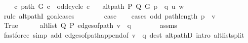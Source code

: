 \begin{isabellebody}
\ \ \ {\isachardoublequoteopen}{\isasymnot}\ {\isacharparenleft}{\kern0pt}{\isasymexists}c{\isachardot}{\kern0pt}\ path\ G\ c\ {\isasymand}\ odd{\isacharunderscore}{\kern0pt}cycle\ c{\isacharparenright}{\kern0pt}{\isachardoublequoteclose}\isanewline
\ \ \ {\isachardoublequoteopen}alt{\isacharunderscore}{\kern0pt}path\ P\ Q\ G\ {\isacharparenleft}{\kern0pt}p{\isacharprime}{\kern0pt}\ {\isacharat}{\kern0pt}\ q{\isacharparenright}{\kern0pt}\ u\ w{\isachardoublequoteclose}\isanewline
%
\isadelimproof
%
\endisadelimproof
%
\isatagproof
{}\isamarkupfalse%
\ {\isacharparenleft}{\kern0pt}rule\ alt{\isacharunderscore}{\kern0pt}pathI{\isacharcomma}{\kern0pt}\ goal{\isacharunderscore}{\kern0pt}cases{\isacharparenright}{\kern0pt}\isanewline
\ \ \isamarkupfalse%
\ {}\isanewline
\ \ \isamarkupfalse%
\ {\isacharquery}{\kern0pt}case\isanewline
\ \ \isamarkupfalse%
\ {\isacharparenleft}{\kern0pt}cases\ {\isachardoublequoteopen}odd\ {\isacharparenleft}{\kern0pt}path{\isacharunderscore}{\kern0pt}length\ {\isacharparenleft}{\kern0pt}p\ {\isacharat}{\kern0pt}\ {\isacharbrackleft}{\kern0pt}v{\isacharbrackright}{\kern0pt}{\isacharparenright}{\kern0pt}{\isacharparenright}{\kern0pt}{\isachardoublequoteclose}{\isacharparenright}{\kern0pt}\isanewline
\ \ \ \ \isamarkupfalse%
\ True\isanewline
\ \ \ \ \isamarkupfalse%
\ {\isachardoublequoteopen}alt{\isacharunderscore}{\kern0pt}list\ Q\ P\ {\isacharparenleft}{\kern0pt}edges{\isacharunderscore}{\kern0pt}of{\isacharunderscore}{\kern0pt}path\ {\isacharparenleft}{\kern0pt}v\ {\isacharhash}{\kern0pt}\ q{\isacharparenright}{\kern0pt}{\isacharparenright}{\kern0pt}{\isachardoublequoteclose}\isanewline
\ \ \ \ \ \ \isamarkupfalse%
\ assms{\isacharparenleft}{\kern0pt}{}{\isacharparenright}{\kern0pt}\isanewline
\ \ \ \ \ \ \isamarkupfalse%
\ {\isacharparenleft}{\kern0pt}fastforce\ simp\ add{\isacharcolon}{\kern0pt}\ edges{\isacharunderscore}{\kern0pt}of{\isacharunderscore}{\kern0pt}path{\isacharunderscore}{\kern0pt}append{\isacharunderscore}{\kern0pt}{}{\isacharbrackleft}{\kern0pt}of\ {\isachardoublequoteopen}v\ {\isacharhash}{\kern0pt}\ q{\isachardoublequoteclose}{\isacharbrackright}{\kern0pt}\ dest{\isacharcolon}{\kern0pt}\ alt{\isacharunderscore}{\kern0pt}pathD{\isacharparenleft}{\kern0pt}{}{\isacharparenright}{\kern0pt}\ intro{\isacharcolon}{\kern0pt}\ alt{\isacharunderscore}{\kern0pt}list{\isacharunderscore}{\kern0pt}split{\isacharunderscore}{\kern0pt}{}{\isacharparenright}{\kern0pt}\isanewline

\end{isabellebody}
